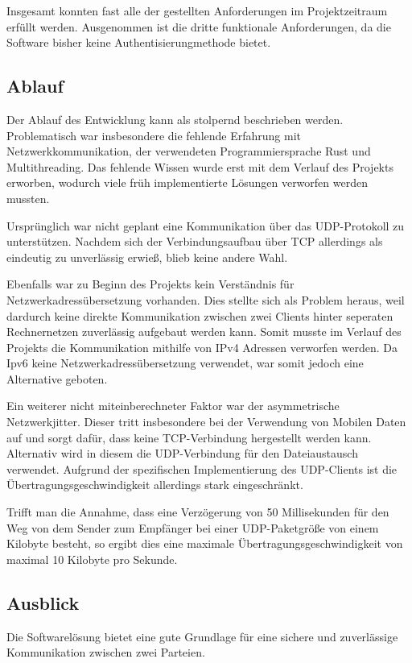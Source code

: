 Insgesamt konnten fast alle der gestellten Anforderungen im Projektzeitraum erfüllt werden. Ausgenommen ist die dritte funktionale Anforderungen, da die Software bisher keine Authentisierungmethode bietet.

\subsection{Ablauf}
Der Ablauf des Entwicklung kann als stolpernd beschrieben werden. Problematisch war insbesondere die fehlende Erfahrung mit Netzwerkkommunikation, der verwendeten Programmiersprache Rust und Multithreading. Das fehlende Wissen wurde erst mit dem Verlauf des Projekts erworben, wodurch viele früh implementierte Lösungen verworfen werden mussten.

Ursprünglich war nicht geplant eine Kommunikation über das UDP-Protokoll zu unterstützen. Nachdem sich der Verbindungsaufbau über TCP allerdings als eindeutig zu unverlässig erwieß, blieb keine andere Wahl.

Ebenfalls war zu Beginn des Projekts kein Verständnis für Netzwerkadressübersetzung vorhanden. Dies stellte sich als Problem heraus, weil dardurch keine direkte Kommunikation zwischen zwei Clients hinter seperaten Rechnernetzen zuverlässig aufgebaut werden kann. Somit musste im Verlauf des Projekts die Kommunikation mithilfe von IPv4 Adressen verworfen werden. Da Ipv6 keine Netzwerkadressübersetzung verwendet, war somit jedoch eine Alternative geboten.

Ein weiterer nicht miteinberechneter Faktor war der asymmetrische Netzwerkjitter. Dieser tritt insbesondere bei der Verwendung von Mobilen Daten auf und sorgt dafür, dass keine TCP-Verbindung hergestellt werden kann. Alternativ wird in diesem die UDP-Verbindung für den Dateiaustausch verwendet. Aufgrund der spezifischen Implementierung des UDP-Clients ist die Übertragungsgeschwindigkeit allerdings stark eingeschränkt.

Trifft man die Annahme, dass eine Verzögerung von 50 Millisekunden für den Weg von dem Sender zum Empfänger bei einer UDP-Paketgröße von einem Kilobyte besteht, so ergibt dies eine maximale Übertragungsgeschwindigkeit von maximal 10 Kilobyte pro Sekunde.

\subsection{Ausblick}
Die Softwarelösung bietet eine gute Grundlage für eine sichere und zuverlässige Kommunikation zwischen zwei Parteien. 

